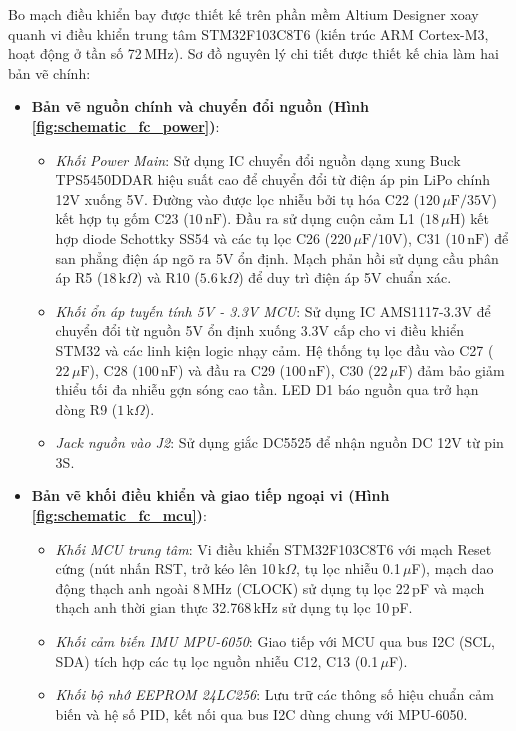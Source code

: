 Bo mạch điều khiển bay được thiết kế trên phần mềm Altium Designer xoay quanh vi điều khiển trung tâm STM32F103C8T6 (kiến trúc ARM Cortex-M3, hoạt động ở tần số 72\,MHz). Sơ đồ nguyên lý chi tiết được thiết kế chia làm hai bản vẽ chính:
\begin{itemize}
    \item \textbf{Bản vẽ nguồn chính và chuyển đổi nguồn (Hình \ref{fig:schematic_fc_power})}:
    \begin{itemize}
        \item \textit{Khối Power Main}: Sử dụng IC chuyển đổi nguồn dạng xung Buck TPS5450DDAR hiệu suất cao để chuyển đổi từ điện áp pin LiPo chính 12V xuống 5V. Đường vào được lọc nhiễu bởi tụ hóa C22 ($120\,\mu\text{F}/35\text{V}$) kết hợp tụ gốm C23 ($10\,\text{nF}$). Đầu ra sử dụng cuộn cảm L1 ($18\,\mu\text{H}$) kết hợp diode Schottky SS54 và các tụ lọc C26 ($220\,\mu\text{F}/10\text{V}$), C31 ($10\,\text{nF}$) để san phẳng điện áp ngõ ra 5V ổn định. Mạch phản hồi sử dụng cầu phân áp R5 ($18\,\text{k}\Omega$) và R10 ($5.6\,\text{k}\Omega$) để duy trì điện áp 5V chuẩn xác.
        \item \textit{Khối ổn áp tuyến tính 5V - 3.3V MCU}: Sử dụng IC AMS1117-3.3V để chuyển đổi từ nguồn 5V ổn định xuống 3.3V cấp cho vi điều khiển STM32 và các linh kiện logic nhạy cảm. Hệ thống tụ lọc đầu vào C27 ($22\,\mu\text{F}$), C28 ($100\,\text{nF}$) và đầu ra C29 ($100\,\text{nF}$), C30 ($22\,\mu\text{F}$) đảm bảo giảm thiểu tối đa nhiễu gợn sóng cao tần. LED D1 báo nguồn qua trở hạn dòng R9 ($1\,\text{k}\Omega$).
        \item \textit{Jack nguồn vào J2}: Sử dụng giắc DC5525 để nhận nguồn DC 12V từ pin 3S.
    \end{itemize}
    \item \textbf{Bản vẽ khối điều khiển và giao tiếp ngoại vi (Hình \ref{fig:schematic_fc_mcu})}:
    \begin{itemize}
        \item \textit{Khối MCU trung tâm}: Vi điều khiển STM32F103C8T6 với mạch Reset cứng (nút nhấn RST, trở kéo lên 10\,k$\Omega$, tụ lọc nhiễu 0.1\,$\mu$F), mạch dao động thạch anh ngoài 8\,MHz (CLOCK) sử dụng tụ lọc 22\,pF và mạch thạch anh thời gian thực 32.768\,kHz sử dụng tụ lọc 10\,pF.
        \item \textit{Khối cảm biến IMU MPU-6050}: Giao tiếp với MCU qua bus I2C (SCL, SDA) tích hợp các tụ lọc nguồn nhiễu C12, C13 (0.1\,$\mu$F).
        \item \textit{Khối bộ nhớ EEPROM 24LC256}: Lưu trữ các thông số hiệu chuẩn cảm biến và hệ số PID, kết nối qua bus I2C dùng chung với MPU-6050.

\end{itemize}
\end{itemize}

